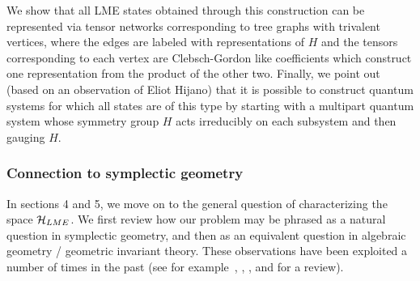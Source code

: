 \documentclass[12pt]{article}
\theoremstyle{definition}
\begin{document}
We show that all LME states obtained through this construction can be represented via tensor networks corresponding to tree graphs with trivalent vertices, where the edges are labeled with representations of $H$ and the tensors corresponding to each vertex are Clebsch-Gordon like coefficients which construct one representation from the product of the other two. Finally, we point out (based on an observation of Eliot Hijano) that it is possible to construct quantum systems for which all states are of this type by starting with a multipart quantum system whose symmetry group $H$ acts irreducibly on each subsystem and then gauging $H$.

\subsubsection{Connection to symplectic geometry}

In sections 4 and 5, we move on to the general question of
characterizing the space ${\cal H}_{LME}$. We first review how our
problem may be phrased as a natural question in symplectic
geometry, and then as an equivalent question in algebraic geometry / geometric invariant theory.
These observations have been exploited a number of times in the past (see for example~\cite{Kly02}, \cite[\S~3]{Kly07}, \cite[\S~4]{wallach}, and \cite{Walter} for a review).
\end{document}

